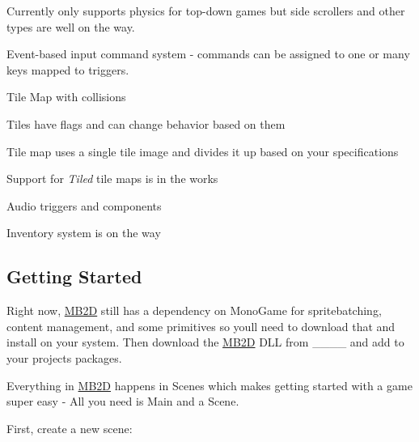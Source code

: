 \begin{DoxyItemize}
\begin{DoxyItemize}
\item Currently only supports physics for top-\/down games but side scrollers and other types are well on the way.
\end{DoxyItemize}
\item Event-\/based input command system -\/ commands can be assigned to one or many keys mapped to triggers.
\item Tile Map with collisions
\begin{DoxyItemize}
\item Tiles have flags and can change behavior based on them
\item Tile map uses a single tile image and divides it up based on your specifications
\item Support for {\itshape Tiled} tile maps is in the works
\end{DoxyItemize}
\item Audio triggers and components
\item Inventory system is on the way
\end{DoxyItemize}

\subsection*{Getting Started}

Right now, \hyperlink{namespace_m_b2_d}{M\+B2D} still has a dependency on Mono\+Game for spritebatching, content management, and some primitives so you\textquotesingle{}ll need to download that and install on your system. Then download the \hyperlink{namespace_m_b2_d}{M\+B2D} D\+LL from \+\_\+\+\_\+\+\_\+\+\_\+ and add to your projects packages.

Everything in \hyperlink{namespace_m_b2_d}{M\+B2D} happens in {\ttfamily Scenes} which makes getting started with a game super easy -\/ All you need is {\ttfamily Main} and a {\ttfamily Scene}.

First, create a new scene\+:


